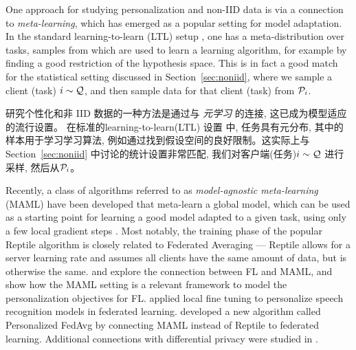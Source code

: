 One approach for studying personalization and non-IID data is via a connection to {\em meta-learning}, which has emerged as a popular setting for model adaptation.
%
In the standard learning-to-learn (LTL) setup \citep{baxter00model}, one has a meta-distribution over tasks, samples from which are used to learn a learning algorithm, for example by finding a good restriction of the hypothesis space. This is in fact a good match for the statistical setting discussed in Section~\ref{sec:noniid}, where we sample a client (task) $i \sim \mathcal{Q}$, and then sample data for that client (task) from $\mathcal{P}_i$.

 
研究个性化和非 IID 数据的一种方法是通过与 {\em 元学习} 的连接, 这已成为模型适应的流行设置。
%
在标准的learning-to-learn(LTL) 设置 \citep{baxter00model} 中, 任务具有元分布, 其中的样本用于学习学习算法, 例如通过找到假设空间的良好限制。这实际上与 Section~\ref{sec:noniid} 中讨论的统计设置非常匹配, 我们对客户端(任务)$i \sim \mathcal{Q}$ 进行采样, 然后从$\mathcal{P}_i$。


Recently, a class of algorithms referred to as \emph{model-agnostic meta-learning} (MAML) have been developed that meta-learn a global model, which can be used as a starting point for learning a good model adapted to a given task, using only a few local gradient steps \citep{finn17maml}. Most notably, the training phase of the popular Reptile algorithm \citep{nichol18reptile} is closely related to Federated Averaging \citep{mcmahan17fedavg} --- Reptile allows for a server learning rate and assumes all clients have the same amount of data, but is otherwise the same. \citet{khodak19adaptive} and \citet{jiang2019improving} explore the connection between FL and MAML, and show how the MAML setting is a relevant framework to model the personalization objectives for FL. \citet{chai2019personalization} applied local fine tuning to personalize speech recognition models in federated learning. \citet{fallah2020personalized} developed a new algorithm called Personalized FedAvg by connecting MAML instead of Reptile to federated learning. Additional connections with differential privacy were studied in \citep{li19dpmeta}.

